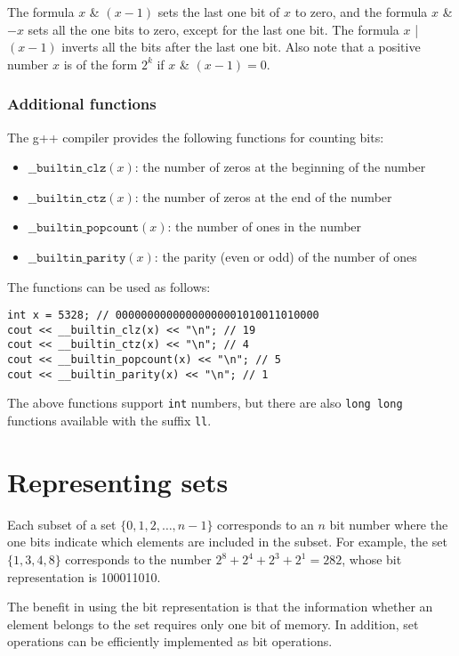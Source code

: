 The formula $x$ \& $(x-1)$ sets the last
one bit of $x$ to zero,
and the formula $x$ \& $-x$ sets all the
one bits to zero, except for the last one bit.
The formula $x$ | $(x-1)$
inverts all the bits after the last one bit.
Also note that a positive number $x$ is
of the form $2^k$ if $x$ \& $(x-1) = 0$.

\subsubsection*{Additional functions}

The g++ compiler provides the following
functions for counting bits:

\begin{itemize}
\item
$\texttt{\_\_builtin\_clz}(x)$:
the number of zeros at the beginning of the number
\item
$\texttt{\_\_builtin\_ctz}(x)$:
the number of zeros at the end of the number
\item
$\texttt{\_\_builtin\_popcount}(x)$:
the number of ones in the number
\item
$\texttt{\_\_builtin\_parity}(x)$:
the parity (even or odd) of the number of ones
\end{itemize}
\begin{samepage}

The functions can be used as follows:
\begin{lstlisting}
int x = 5328; // 00000000000000000001010011010000
cout << __builtin_clz(x) << "\n"; // 19
cout << __builtin_ctz(x) << "\n"; // 4
cout << __builtin_popcount(x) << "\n"; // 5
cout << __builtin_parity(x) << "\n"; // 1
\end{lstlisting}
\end{samepage}

The above functions support \texttt{int} numbers,
but there are also \texttt{long long} functions
available with the suffix \texttt{ll}.

\section{Representing sets}

Each subset of a set $\{0,1,2,\ldots,n-1\}$
corresponds to an $n$ bit number
where the one bits indicate which elements
are included in the subset.
For example, the set $\{1,3,4,8\}$
corresponds to the number $2^8+2^4+2^3+2^1=282$,
whose bit representation is 100011010.

The benefit in using the bit representation
is that the information whether an element belongs
to the set requires only one bit of memory.
In addition, set operations can be efficiently
implemented as bit operations.


